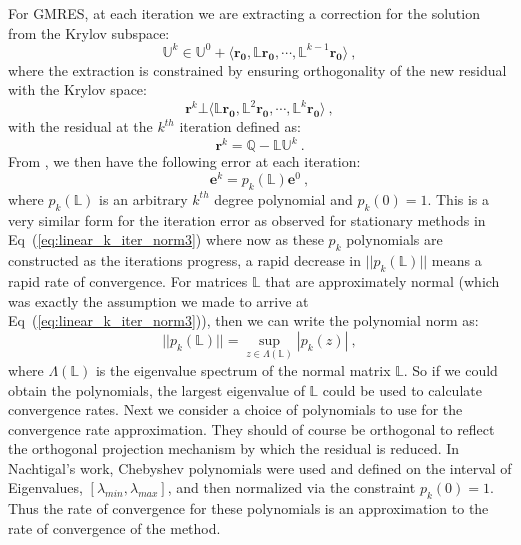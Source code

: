 \documentclass[letterpaper,12pt]{article}
\begin{document}
For GMRES, at each iteration we are extracting a correction for the
solution from the Krylov subspace:
\begin{equation}
  \mathbb{U}^k \in \mathbb{U}^0 + \langle \mathbf{r_0}, \mathbb{L}
  \mathbf{r_0}, \cdots, \mathbb{L}^{k-1} \mathbf{r_0} \rangle\:,
  \label{eq:gmres_iteration}
\end{equation}
where the extraction is constrained by ensuring orthogonality of the new
residual with the Krylov space:
\begin{equation}
  \mathbf{r}^k \bot \langle \mathbb{L} \mathbf{r_0}, \mathbb{L}^2
  \mathbf{r_0}, \cdots, \mathbb{L}^{k} \mathbf{r_0} \rangle\:,
  \label{eq:gmres_constraint}
\end{equation}
with the residual at the $k^{th}$ iteration defined as:
\begin{equation}
  \mathbf{r}^k = \mathbb{Q} - \mathbb{L}\mathbb{U}^k\:.
  \label{eq:residual}
\end{equation}
From \cite{nachtigal_how_1992}, we then have the following error at
each iteration:
\begin{equation}
  \mathbf{e}^k = p_k(\mathbb{L})\mathbf{e}^0\:,
  \label{eq:gmres_iteration_error}
\end{equation}
where $p_k(\mathbb{L})$ is an arbitrary $k^{th}$ degree polynomial and
$p_k(0)=1$. This is a very similar form for the iteration error as
observed for stationary methods in Eq~(\ref{eq:linear_k_iter_norm3})
where now as these $p_k$ polynomials are constructed as the iterations
progress, a rapid decrease in $||p_k(\mathbb{L})||$ means a rapid rate
of convergence. For matrices $\mathbb{L}$ that are approximately
normal (which was exactly the assumption we made to arrive at
Eq~(\ref{eq:linear_k_iter_norm3})), then we can write the polynomial
norm as:
\begin{equation}
  ||p_k(\mathbb{L})|| = \sup_{z\in\Lambda(\mathbb{L})}|p_k(z)|\:,
  \label{eq:gmres_polynomial}
\end{equation}
where $\Lambda(\mathbb{L})$ is the eigenvalue spectrum of the normal
matrix $\mathbb{L}$. So if we could obtain the polynomials, the
largest eigenvalue of $\mathbb{L}$ could be used to calculate
convergence rates. Next we consider a choice of polynomials to use for
the convergence rate approximation. They should of course be
orthogonal to reflect the orthogonal projection mechanism by which the
residual is reduced. In Nachtigal's work, Chebyshev polynomials were
used and defined on the interval of Eigenvalues,
$[\lambda_{min},\lambda_{max}]$, and then normalized via the
constraint $p_k(0)=1$. Thus the rate of convergence for these
polynomials is an approximation to the rate of convergence of the
method.
\end{document}
